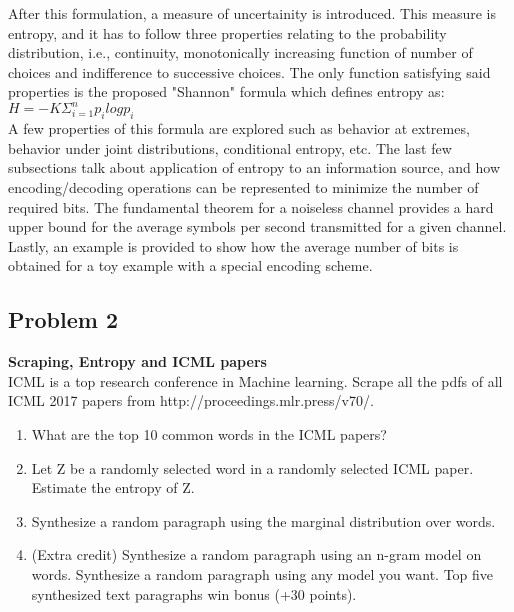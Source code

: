 \documentclass[12pt]{article}%
\begin{document}
After this formulation, a measure of uncertainity is introduced. This measure is entropy, and it has to follow three properties relating to the probability distribution, i.e., continuity, monotonically increasing function of number of choices and indifference to successive choices. The only function satisfying said properties is the proposed "Shannon" formula which defines entropy as:\\

$H = -K \Sigma_{i=1}^n p_i logp_i$\\

A few properties of this formula are explored such as behavior at extremes, behavior under joint distributions, conditional entropy, etc. The last few subsections talk about application of entropy to an information source, and how encoding/decoding operations can be represented to minimize the number of required bits. The fundamental theorem for a noiseless channel provides a hard upper bound for the average symbols per second transmitted for a given channel. Lastly, an example is provided to show how the average number of bits is obtained for a toy example with a special encoding scheme. \\




\subsection{Problem 2}

\textbf{Scraping, Entropy and ICML papers}\\

ICML is a top research conference in Machine learning. Scrape all the pdfs of all ICML 2017 papers from http://proceedings.mlr.press/v70/.
\begin{enumerate}
    \item What are the top 10 common words in the ICML papers?
    \item Let Z be a randomly selected word in a randomly selected ICML paper. Estimate the entropy of Z.
    \item Synthesize a random paragraph using the marginal distribution over words.
    \item (Extra credit) Synthesize a random paragraph using an n-gram model on words. Synthesize a random paragraph using any model you want. Top five synthesized text paragraphs win bonus (+30 points).\\
\end{enumerate}
\end{document}
